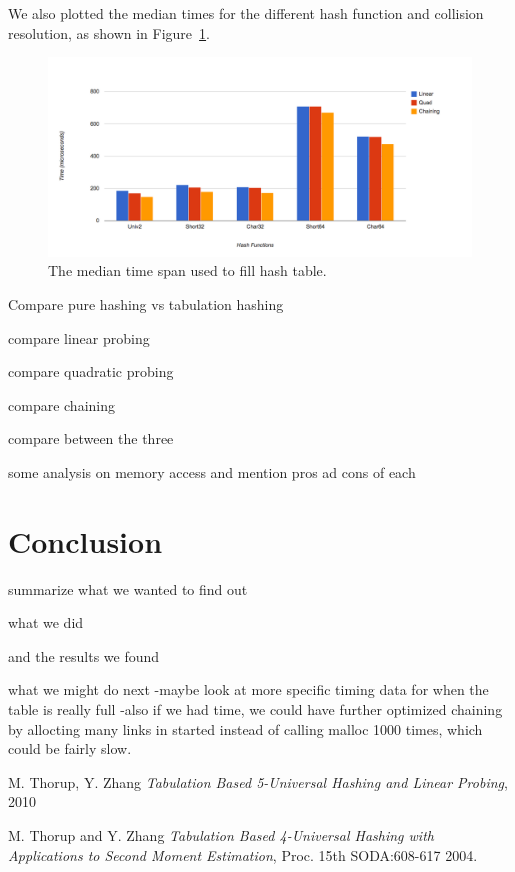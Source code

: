 \documentclass[11pt]{article}
\begin{document}
We also plotted the median times for the different hash function and collision resolution,
as shown in Figure~\ref{fig:timemedian}. 


\begin{figure}
                \centering
                \includegraphics[width=\textwidth]{time-median.png}
              \caption{The median time span used to fill hash table.}
              \label{fig:timemedian}
\end{figure}


Compare pure hashing vs tabulation hashing

compare linear probing

compare quadratic probing

compare chaining

compare between the three

some analysis on memory access  and mention pros ad cons of each


\section{Conclusion}
summarize what we wanted to find out

what we did

and the results we found

what we might do next
-maybe look at more specific timing data for when the table is really full
-also if we had time, we could have further optimized chaining by allocting many links in started 
instead of calling malloc 1000 times, which could be fairly slow.



\begin{thebibliography}{77}

M. Thorup, Y. Zhang
\emph{Tabulation Based 5-Universal Hashing and Linear Probing},
2010

M. Thorup and Y. Zhang 
\emph{Tabulation Based 4-Universal Hashing with Applications to Second Moment Estimation},
Proc. 15th SODA:608-617 2004.


\end{thebibliography}


\end{document}

